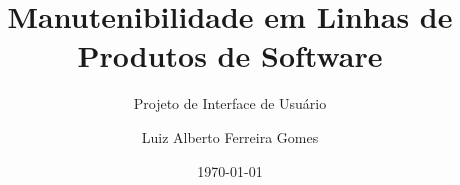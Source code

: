 \author{Luiz Alberto Ferreira Gomes}
\title{Manutenibilidade em Linhas de Produtos de Software}
\subtitle{Projeto de Interface de Usuário  }
\date{\today}

